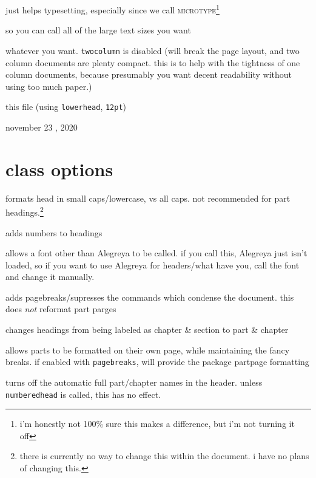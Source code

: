 \documentclass[lowerhead,12pt]{aesthetic}
\begin{document}
\begin{description}
\begin{description}[font=\ttfamily]
        \item[fullptlayout] just helps typesetting, especially since we call {\scshape\ttfamily microtype}\footnote{i'm honestly not 100\% sure this makes a difference, but i'm not turning it off}
        \item[extrafontsizes] so you can call all of the large text sizes you want
        \item[[user options{]}] whatever you want. \texttt{twocolumn} is disabled (will break the page layout, and two column documents are plenty compact. this is to help with the tightness of one column documents, because presumably you want decent readability without using too much paper.)
    \end{description}
    \item[example] this file (using \texttt{lowerhead}, \texttt{12pt})
    \item[last updated] november 23 , 2020
\end{description}

\section{class options}\label{sec:aesop}
\begin{description}[font=\ttfamily]
    \item[lowerhead] formats head in small caps/lowercase, vs all caps. not recommended for part headings.\footnote{there is currently no way to change this within the document. i have no plans of changing this.}
    \item[numberedhead] adds numbers to headings\footnotemark[\thefootnote]
    \item[otherfont] allows a font other than Alegreya to be called. if you call this, Alegreya just isn't loaded, so if you want to use Alegreya for headers/what have you, call the font and change it manually.
    \item[pagebreaks] adds pagebreaks/supresses the commands which condense the document. this does \emph{not} reformat part parges
    \item[partheadings] changes headings from being labeled as chapter \& section to part \& chapter\footnotemark[\thefootnote]
    \item[partpages] allows parts to be formatted on their own page, while maintaining the fancy breaks. if enabled with \texttt{pagebreaks}, will provide the package partpage formatting
    \item[shortnames] turns off the automatic full part/chapter names in the header. unless \texttt{numberedhead} is called, this has no effect.
\end{description}
\end{document}

